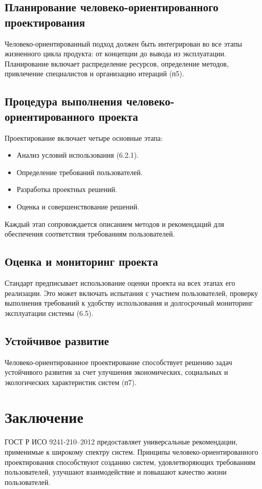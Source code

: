 \subsection*{Планирование человеко-ориентированного проектирования}
Человеко-ориентированный подход должен быть интегрирован во все этапы жизненного цикла продукта:
от концепции до вывода из эксплуатации.
Планирование включает распределение ресурсов, определение методов, привлечение специалистов и организацию итераций (п5).

\subsection*{Процедура выполнения человеко-ориентированного проекта}
Проектирование включает четыре основные этапа:
\begin{itemize}
    \item Анализ условий использования (6.2.1).
    \item Определение требований пользователей.
    \item Разработка проектных решений.
    \item Оценка и совершенствование решений.
\end{itemize}
Каждый этап сопровождается описанием методов и рекомендаций для обеспечения соответствия требованиям пользователей.

\subsection*{Оценка и мониторинг проекта}
Стандарт предписывает использование оценки проекта на всех этапах его реализации.
Это может включать испытания с участием пользователей, проверку выполнения требований к удобству использования
и долгосрочный мониторинг эксплуатации системы (6.5).

\subsection*{Устойчивое развитие}
Человеко-ориентированное проектирование способствует решению задач устойчивого развития за счет улучшения экономических,
социальных и экологических характеристик систем (п7).

\section*{Заключение}
ГОСТ Р ИСО 9241-210–2012 предоставляет универсальные рекомендации, применимые к широкому спектру систем.
Принципы человеко-ориентированного проектирования способствуют созданию систем, удовлетворяющих требованиям
пользователей, улучшают взаимодействие и повышают качество жизни пользователей.



